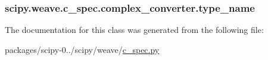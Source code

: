 \subsubsection[{type\+\_\+name}]{\setlength{\rightskip}{0pt plus 5cm}scipy.\+weave.\+c\+\_\+spec.\+complex\+\_\+converter.\+type\+\_\+name}\label{classscipy_1_1weave_1_1c__spec_1_1complex__converter_ae489c2f7cc630d5e1e2486bac6605163}


The documentation for this class was generated from the following file\+:\begin{DoxyCompactItemize}
\item 
packages/scipy-\/0../scipy/weave/\hyperlink{c__spec_8py}{c\+\_\+spec.\+py}\end{DoxyCompactItemize}
